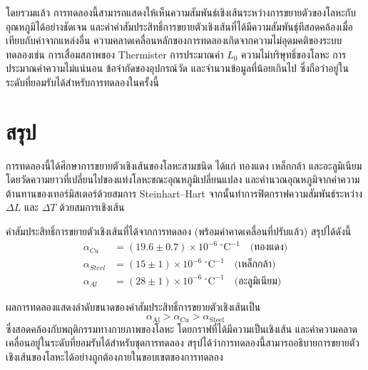 \documentclass[11pt,a4paper]{article}
\begin{document}
โดยรวมแล้ว การทดลองนี้สามารถแสดงให้เห็นความสัมพันธ์เชิงเส้นระหว่างการขยายตัวของโลหะกับอุณหภูมิได้อย่างชัดเจน
และค่าค่าสัมประสิทธิ์การขยายตัวเชิงเส้นที่ได้มีความสัมพันธ์ุทีสอดคล้องเมื่อเทียบกับค่าจากแหล่งอื่น
ความคลาดเคลื่อนหลักของการทดลองเกิดจากความไม่อุดมคติของระบบทดลองเช่น การเสื่อมสภาพของ Thermister การประมาณค่า $L_0$ ความไม่บริษุทธิ์ของโลหะ การประมาณค่าความไม่แน่นอน ข้อจำกัดของอุปกรณ์วัด และจำนวนข้อมูลที่น้อยเกินไป ซึ่งถือว่าอยู่ในระดับที่ยอมรับได้สำหรับการทดลองในครั้งนี้




\section{สรุป} \label{conclusion}

การทดลองนี้ได้ศึกษาการขยายตัวเชิงเส้นของโลหะสามชนิด ได้แก่ ทองแดง เหล็กกล้า และอะลูมิเนียม
โดยวัดความยาวที่เปลี่ยนไปของแท่งโลหะขณะอุณหภูมิเปลี่ยนแปลง
และคำนวณอุณหภูมิจากค่าความต้านทานของเทอร์มิสเตอร์ด้วยสมการ Steinhart--Hart
จากนั้นทำการฟิตกราฟความสัมพันธ์ระหว่าง $\Delta L$ และ $\Delta T$ ด้วยสมการเชิงเส้น

ค่าสัมประสิทธิ์การขยายตัวเชิงเส้นที่ได้จากการทดลอง (พร้อมค่าคาดเคลื่อนที่ปรับแล้ว)
สรุปได้ดังนี้
\begin{align*}
\alpha_{Cu} &= (19.6 \pm 0.7)\times10^{-6}\ ^\circ\mathrm{C}^{-1} \quad \text{(ทองแดง)} \\
\alpha_{Steel} &= (15 \pm 1)\times10^{-6}\ ^\circ\mathrm{C}^{-1} \quad \text{(เหล็กกล้า)} \\
\alpha_{Al} &= (28 \pm 1)\times10^{-6}\ ^\circ\mathrm{C}^{-1} \quad \text{(อะลูมิเนียม)}
\end{align*}

ผลการทดลองแสดงลำดับขนาดของค่าสัมประสิทธิ์การขยายตัวเชิงเส้นเป็น
\[
\alpha_{\text{Al}} > \alpha_{\text{Cu}} > \alpha_{\text{Steel}}
\]
ซึ่งสอดคล้องกับพฤติกรรมทางกายภาพของโลหะ
โดยกราฟที่ได้มีความเป็นเชิงเส้น และค่าความคลาดเคลื่อนอยู่ในระดับที่ยอมรับได้สำหรับชุดการทดลอง
สรุปได้ว่าการทดลองนี้สามารถอธิบายการขยายตัวเชิงเส้นของโลหะได้อย่างถูกต้องภายในขอบเขตของการทดลอง
\end{document}
